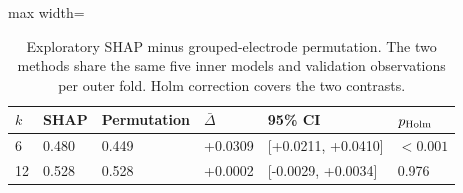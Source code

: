 \begin{table}[htbp]
\centering\small
\caption{Exploratory SHAP minus grouped-electrode permutation. The two methods share the same five inner models and validation observations per outer fold. Holm correction covers the two contrasts.}\label{tab:matched}
\begin{adjustbox}{max width=\textwidth}
\begin{tabular}{llllll}\toprule
$k$ & SHAP & Permutation & $\bar\Delta$ & 95\% CI & $p_{\rm Holm}$\\\midrule
6 & 0.480 & 0.449 & +0.0309 & [+0.0211, +0.0410] & $<0.001$\\
12 & 0.528 & 0.528 & +0.0002 & [-0.0029, +0.0034] & 0.976\\
\bottomrule\end{tabular}
\end{adjustbox}
\end{table}
